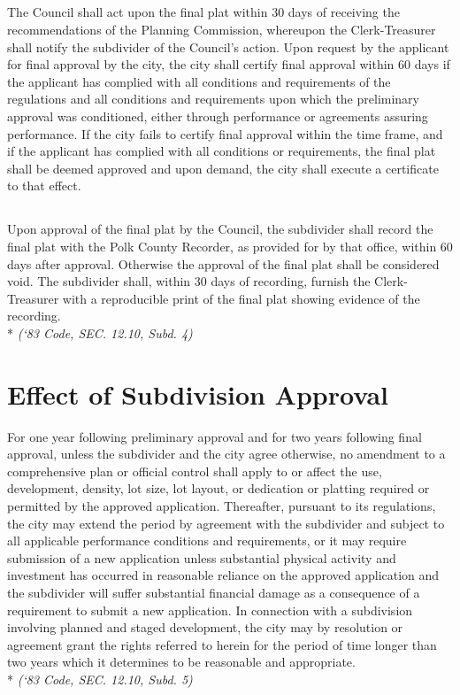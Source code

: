\subsection{}
The Council shall act upon the final plat within 30 days of receiving the recommendations of the Planning Commission, whereupon the Clerk-Treasurer shall notify the subdivider of the Council’s action. Upon request by the applicant for final approval by the city, the city shall certify final approval within 60 days if the applicant has complied with all conditions and requirements of the regulations and all conditions and requirements upon which the preliminary approval was conditioned, either through performance or agreements assuring performance. If the city fails to certify final approval within the time frame, and if the applicant has complied with all conditions or requirements, the final plat shall be deemed approved and upon demand, the city shall execute a certificate to that effect.
\subsection{}
Upon approval of the final plat by the Council, the subdivider shall record the final plat with the Polk County Recorder, as provided for by that office, within 60 days after approval.  Otherwise the approval of the final plat shall be considered void. The subdivider shall, within 30 days of recording, furnish the Clerk-Treasurer with a reproducible print of the final plat showing evidence of the recording.\\*
\emph{(‘83 Code, SEC. 12.10, Subd. 4)}
\section{Effect of Subdivision Approval}
For one year following preliminary approval and for two years following final approval, unless the subdivider and the city agree otherwise, no amendment to a comprehensive plan or official control shall apply to or affect the use, development, density, lot size, lot layout, or dedication or platting required or permitted by the approved application. Thereafter, pursuant to its regulations, the city may extend the period by agreement with the subdivider and subject to all applicable performance conditions and requirements, or it may require submission of a new application unless substantial physical activity and investment has occurred in reasonable reliance on the approved application and the subdivider will suffer substantial financial damage as a consequence of a requirement to submit a new application. In connection with a subdivision involving planned and staged development, the city may by resolution or agreement grant the rights referred to herein for the period of time longer than two years which it determines to be reasonable and appropriate.\\*
\emph{(‘83 Code, SEC. 12.10, Subd. 5)}
